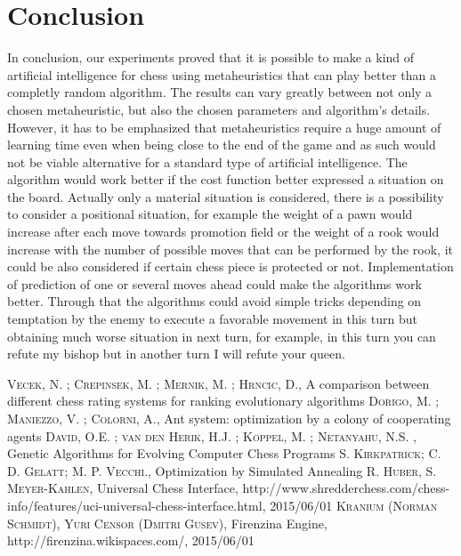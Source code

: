 \documentclass[pdftex]{article}
\begin{document}
\section{Conclusion}
\label{sec:conclusion}

In conclusion, our experiments proved that it is possible to make a kind of artificial intelligence for chess using metaheuristics that can play better than a completly random algorithm. The results can vary greatly between not only a chosen metaheuristic, but also the chosen parameters and algorithm's details. However, it has to be emphasized that metaheuristics require a huge amount of learning time even when being close to the end of the game and as such would not be viable alternative for a standard type of artificial intelligence.
The algorithm would work better if the cost function better expressed a situation on the board. Actually only a material situation is considered, there is a possibility to consider a positional situation, for example the weight of a pawn would increase after each move towards promotion field or the weight of a rook would increase with the number of possible moves that can be performed by the rook, it could be also considered if certain chess piece is protected or not.
Implementation of prediction of one or several moves ahead could make the algorithms work better. Through that the algorithms could avoid simple tricks depending on temptation by the enemy to execute a favorable movement in this turn but obtaining much worse situation in next turn, for example, in this turn you can refute my bishop but in another turn I will refute your queen.

\begin{thebibliography}{99}

 \textsc{Vecek, N. ; Crepinsek, M. ; Mernik, M. ; Hrncic, D.}, A comparison between different chess rating systems for ranking evolutionary algorithms 
 \textsc{Dorigo, M. ; Maniezzo, V. ; Colorni, A.}, Ant system: optimization by a colony of cooperating agents 
 \textsc{David, O.E. ; van den Herik, H.J. ; Koppel, M. ; Netanyahu, N.S. }, Genetic Algorithms for Evolving Computer Chess Programs 
 \textsc{S. Kirkpatrick; C. D. Gelatt; M. P. Vecchi.}, Optimization by Simulated Annealing 
 \textsc{R. Huber, S. Meyer-Kahlen}, Universal Chess Interface, http://www.shredderchess.com/chess-info/features/uci-universal-chess-interface.html, 2015/06/01
 \textsc{Kranium (Norman Schmidt), Yuri Censor (Dmitri Gusev)}, Firenzina Engine, http://firenzina.wikispaces.com/, 2015/06/01

\end{thebibliography}
\end{document}
